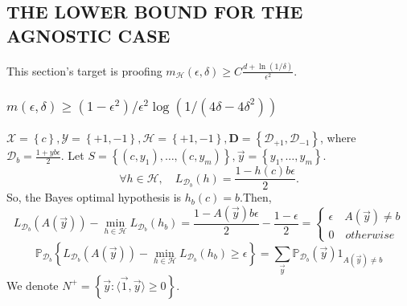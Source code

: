 \subsection{THE LOWER BOUND FOR THE AGNOSTIC CASE}%

This section's target is proofing $ m_\mathcal{H} (\epsilon, \delta) \ge C \frac{d + \ln(1/\delta)}{\epsilon^2}  $.

\subsubsection{$ m(\epsilon, \delta) \ge (1-\epsilon^2)/\epsilon^2 \log(1/(4\delta - 4 \delta^2))$}%
\label{ssub:_m_epsilon_delta_ge_0_5_log_1_4delta_epsilon_2_}

$ \mathcal{X} = \left\{ c \right\}, \mathcal{Y} = \left\{ +1, -1 \right\}, \mathcal{H} = \left\{ +1, -1 \right\}, \mathbf{D} = \left\{ \mathcal{D}_{+1}, \mathcal{D}_{-1} \right\}$, where $ \mathcal{D}_b = \frac{1+yb\epsilon}{2}  $.
Let $ S = \left\{ (c, y_1), \ldots, (c, y_m) \right\}, \vec{y} = \left\{ y_1, \ldots, y_m \right\}$.
\[
    \forall h \in \mathcal{H}, \quad L_{\mathcal{D}_b}(h) = \frac{1-h(c) b \epsilon}{2}.
\]
So, the Bayes optimal hypothesis is $ h_b(c) = b $.Then,
\[
    L_{\mathcal{D}_b}(A(\vec{y})) - \min_{h \in \mathcal{H}} L_{\mathcal{D}_b}(h_b)
    = \frac{1 - A(\vec{y}) b \epsilon}{2} - \frac{1 - \epsilon}{2} =
    \begin{cases}
        \epsilon \quad A (\vec{y}) \ne b \\
        0 \quad otherwise
    \end{cases}
\]
\[
    \mathbb{P}_{\mathcal{D}_b} \left\{ L_{\mathcal{D}_b}(A(\vec{y})) - \min_{h \in \mathcal{H}} L_{\mathcal{D}_b}(h_b) \ge \epsilon \right\}
    = \sum^{}_{\vec{y}} \mathbb{P}_{\mathcal{D}_b} (\vec{y}) 1_{A(\vec{y}) \ne b}
\]
We denote $ N^+ = \left\{ \vec{y}: \langle \vec{1}, \vec{y} \rangle \ge 0 \right\} $.
